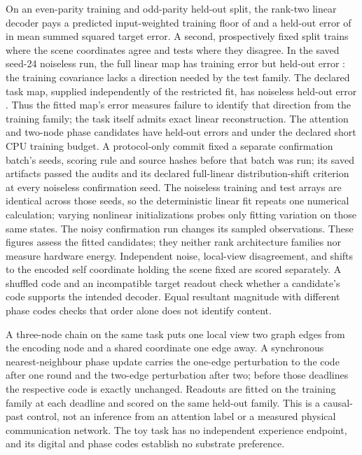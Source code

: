 \documentclass{article}
\begin{document}
On an even-parity training and odd-parity held-out split, the rank-two
linear decoder pays a predicted input-weighted training floor of
\gParityRankTwoFloor{} and a held-out error of
\gParityRankTwoHeldout{} in mean summed squared target error. A second,
prospectively fixed split trains where the scene coordinates agree and tests
where they disagree. In the saved seed-24 noiseless run, the full linear map
has training error
\gSceneFullTrainError{} but held-out error
\gSceneFullHeldoutError{}: the training covariance lacks a direction needed
by the test family. The declared task map, supplied independently of the
restricted fit, has noiseless held-out error \gSceneDeclaredMapHeldout{}.
Thus the fitted map's error measures failure to identify that direction from
the training family; the task itself admits exact linear reconstruction.
The attention and two-node phase candidates have held-out
errors \gSceneAttentionHeldoutError{} and \gScenePhaseHeldoutError{} under
the declared short CPU training budget. A protocol-only commit fixed a
separate confirmation batch's seeds, scoring rule and source hashes before
that batch was run; its saved artifacts passed the audits and its declared
full-linear distribution-shift criterion at every noiseless confirmation
seed. The noiseless training and test arrays are identical across those
seeds, so the deterministic linear fit repeats one numerical calculation;
varying nonlinear initializations probes only fitting variation on those
same states. The noisy confirmation run changes its sampled observations.
These figures assess the fitted candidates; they neither rank
architecture families nor measure hardware energy. Independent noise,
local-view disagreement, and shifts to the
encoded self coordinate holding the scene fixed are scored separately. A
shuffled code and an incompatible target readout check whether a candidate's
code supports the intended decoder. Equal resultant magnitude with different
phase codes checks that order alone does not identify content.

A three-node chain on the same task puts one local view two graph edges from
the encoding node and a shared coordinate one edge away. A synchronous
nearest-neighbour phase update carries the one-edge perturbation to the code
after one round and the two-edge perturbation after two; before those
deadlines the respective code is exactly unchanged. Readouts are fitted on
the training family at each deadline and scored on the same held-out family.
This is a causal-past control, not an inference from an attention label or a
measured physical communication network. The toy task has no independent
experience endpoint, and its digital and phase codes establish no substrate
preference.
\end{document}
